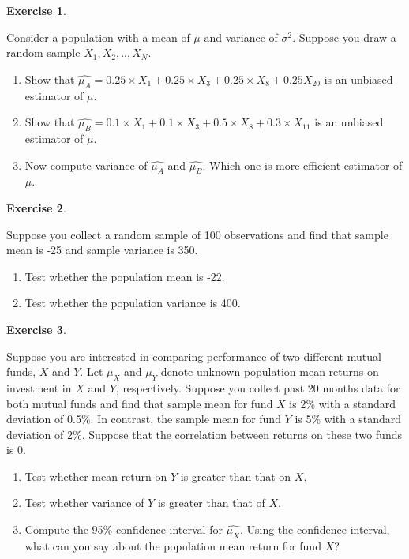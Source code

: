 \documentclass[
]{book}
\theoremstyle{definition}
\theoremstyle{definition}
\theoremstyle{definition}
\newtheorem{exercise}{Exercise}[chapter]
\theoremstyle{definition}
\theoremstyle{remark}
\begin{document}
\begin{exercise}
\protect\hypertarget{exr:unnamed-chunk-55}{}\label{exr:unnamed-chunk-55}

Consider a population with a mean of \(\mu\) and variance of \(\sigma^2\). Suppose you draw a random sample \(X_1, X_2,..,X_N\).

\begin{enumerate}
\def\labelenumi{\alph{enumi}.}
\item
  Show that \(\widehat{\mu_A}=0.25\times X_1 +0.25\times X_3+ 0.25 \times X_8 + 0.25 X_{20}\) is an unbiased estimator of \(\mu\).
\item
  Show that \(\widehat{\mu_B}=0.1\times X_1 +0.1\times X_3+ 0.5 \times X_8+0.3 \times X_{11}\) is an unbiased estimator of \(\mu\).
\item
  Now compute variance of \(\widehat{\mu_A}\) and \(\widehat{\mu_B}\). Which one is more efficient estimator of \(\mu\).
\end{enumerate}

\end{exercise}

\begin{exercise}
\protect\hypertarget{exr:unnamed-chunk-56}{}\label{exr:unnamed-chunk-56}

Suppose you collect a random sample of 100 observations and find that sample mean is -25 and sample variance is 350.

\begin{enumerate}
\def\labelenumi{\alph{enumi}.}
\item
  Test whether the population mean is -22.
\item
  Test whether the population variance is 400.
\end{enumerate}

\end{exercise}

\begin{exercise}
\protect\hypertarget{exr:unnamed-chunk-57}{}\label{exr:unnamed-chunk-57}

Suppose you are interested in comparing performance of two different mutual funds, \(X\) and \(Y\). Let \(\mu_X\) and \(\mu_Y\) denote unknown population mean returns on investment in \(X\) and \(Y\), respectively. Suppose you collect past 20 months data for both mutual funds and find that sample mean for fund \(X\) is 2\% with a standard deviation of 0.5\%. In contrast, the sample mean for fund \(Y\) is 5\% with a standard deviation of 2\%. Suppose that the correlation between returns on these two funds is 0.

\begin{enumerate}
\def\labelenumi{\alph{enumi}.}
\item
  Test whether mean return on \(Y\) is greater than that on \(X\).
\item
  Test whether variance of \(Y\) is greater than that of \(X\).
\item
  Compute the 95\% confidence interval for \(\widehat{\mu_X}\). Using the confidence interval, what can you say about the population mean return for fund \(X\)?
\end{enumerate}

\end{exercise}
\end{document}
